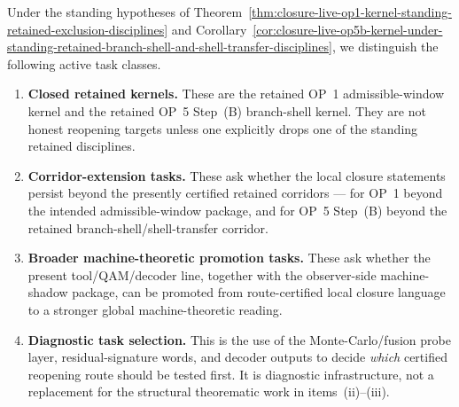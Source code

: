 \begin{definition}
\label{def:certified-post-closure-task-classes-after-retained-op-kernel-closures}
Under the standing hypotheses of Theorem~\ref{thm:closure-live-op1-kernel-standing-retained-exclusion-disciplines} and Corollary~\ref{cor:closure-live-op5b-kernel-under-standing-retained-branch-shell-and-shell-transfer-disciplines}, we distinguish the following active task classes.
\begin{enumerate}[leftmargin=2em]
 \item \textbf{Closed retained kernels.} These are the retained OP~1 admissible-window kernel and the retained OP~5 Step~(B) branch-shell kernel. They are not honest reopening targets unless one explicitly drops one of the standing retained disciplines.
 \item \textbf{Corridor-extension tasks.} These ask whether the local closure statements persist beyond the presently certified retained corridors --- for OP~1 beyond the intended admissible-window package, and for OP~5 Step~(B) beyond the retained branch-shell/shell-transfer corridor.
 \item \textbf{Broader machine-theoretic promotion tasks.} These ask whether the present tool/QAM/decoder line, together with the observer-side machine-shadow package, can be promoted from route-certified local closure language to a stronger global machine-theoretic reading.
 \item \textbf{Diagnostic task selection.} This is the use of the Monte-Carlo/fusion probe layer, residual-signature words, and decoder outputs to decide \emph{which} certified reopening route should be tested first. It is diagnostic infrastructure, not a replacement for the structural theorematic work in items~(ii)--(iii).
\end{enumerate}
\end{definition}

